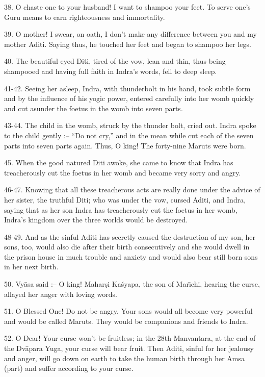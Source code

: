 38. O chaste one to your husband! I want to shampoo your feet. To serve one's Guru means to earn righteousness and immortality.

39. O mother! I swear, on oath, I don't make any difference between you and my mother Aditi. Saying thus, he touched her feet and began to shampoo her legs.

40. The beautiful eyed Diti, tired of the vow, lean and thin, thus being shampooed and having full faith in Indra's words, fell to deep sleep.

41-42. Seeing her asleep, Indra, with thunderbolt in his hand, took subtle form and by the influence of his yogic power, entered carefully into her womb quickly and cut asunder the foetus in the womb into seven parts.

43-44. The child in the womb, struck by the thunder bolt, cried out. Indra spoke to the child gently :-- ``Do not cry,'' and in the mean while cut each of the seven parts into seven parts again. Thus, O king! The forty-nine Maruts were born.

45. When the good natured Diti awoke, she came to know that Indra has treacherously cut the foetus in her womb and became very sorry and angry.

46-47. Knowing that all these treacherous acts are really done under the advice of her sister, the truthful Diti; who was under the vow, cursed Aditi, and Indra, saying that as her son Indra has treacherously cut the foetus in her womb, Indra's kingdom over the three worlds would be destroyed.

48-49. And as the sinful Aditi has secretly caused the destruction of my son, her sons, too, would also die after their birth consecutively and she would dwell in the prison house in much trouble and anxiety and would also bear still born sons in her next birth.

50. Vy\=asa said :-- O king! Mahar\d{s}i Ka\'syapa, the son of Mar\={\i}chi, hearing the curse, allayed her anger with loving words.

51. O Blessed One! Do not be angry. Your sons would all become very powerful and would be called Maruts. They would be companions and friends to Indra.

52. O Dear! Your curse won't be fruitless; in the 28th Manvantara, at the end of the Dv\=apara Yuga, your curse will bear fruit. Then Aditi, sinful for her jealousy and anger, will go down on earth to take the human birth through her Amsa (part) and suffer according to your curse.

